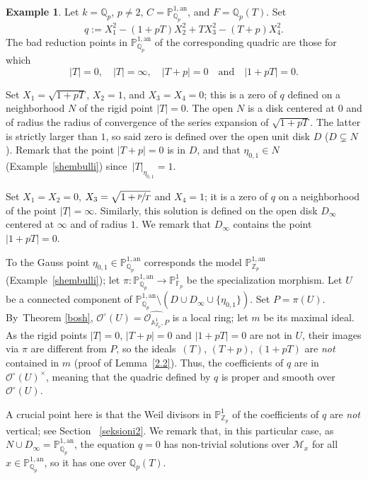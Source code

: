 \documentclass[JEP,XML,SOM,Unicode,NoFloatCountersInSection,published]{cedram}
\newcommand{\quand}{\quad\text{and}\quad}
\let\backslash\setminus
\theoremstyle{definition}
\newtheorem{ex}[thm]{Example}
\begin{document}
\begin{ex}\label{1.8.3}
Let $k=\mathbb{Q}_p$, $p \neq 2$, $C=\mathbb{P}_{\mathbb{Q}_p}^{1, \mathrm{an}}$, and $F=\mathbb{Q}_p(T)$. Set
\[
q:=X_1^2-(1+pT)X_2^2+TX_3^2 - (T+p)X_4^2.
\]
The bad reduction points in $\mathbb{P}_{\mathbb{Q}_p}^{1, \mathrm{an}}$ of the corresponding quadric are those for which
\[
|T|=0,\quad |T|=\infty,\quad |T+p|=0\quand |1+pT|=0.
\]

Set $X_1=\sqrt{1+pT}$, $X_2=1$, and $X_3=X_4=0$; this is a zero of $q$ defined on a neighborhood $N$ of the rigid point $|T|=0$. The open $N$ is a disk centered at $0$ and of radius the radius of convergence of the series expansion of $\sqrt{1+pT}$. The latter is strictly larger than $1$, so said zero is defined over the open unit disk $D$ (\ie $D \subsetneq N$). Remark that the point $|T+p|=0$ is in $D$, and that $\eta_{0,1} \in N$ (\cf Example~\ref{shembulli}) since~$|T|_{\eta_{0,1}}=1$.

Set $X_1=X_2=0$, $X_3=\sqrt{1+\sfrac{p}{T}}$ and $X_4=1$; it is a zero of $q$ on a neighborhood of the point $|T|=\infty$. Similarly, this solution is defined on the open disk $D_{\infty}$ centered at $\infty$ and of radius $1$. We remark that $D_{\infty}$ contains the point $|1+pT|=0$.

To the Gauss point $\eta_{0,1} \in \mathbb{P}_{\mathbb{Q}_p}^{1, \mathrm{an}}$ corresponds the model $\mathbb{P}_{\mathbb{Z}_p}^{1, \mathrm{an}}$ (\cf Example~\ref{shembulli}); let $\pi: \mathbb{P}_{\mathbb{Q}_p}^{1, \mathrm{an}} \to \mathbb{P}_{\mathbb{F}_p}^{1}$ be the specialization morphism.
Let $U$ be a connected component of $\mathbb{P}_{\mathbb{Q}_p}^{1, \mathrm{an}} \backslash (D \cup D_{\infty} \cup \{\eta_{0,1}\})$. Set $P=\pi(U)$. By~Theorem \ref{bosh}, $\mathcal{O}^{\circ}(U)=\widehat{\mathcal{O}_{\mathbb{A}_{\mathbb{Z}_p}^{1},P}}$ is a local ring; let $m$ be its maximal ideal. As the rigid points $|T|=0$, $|T+p|=0$ and $|1+pT|=0$ are not in $U$, their images via $\pi$ are different from $P$, so the ideals~$(T)$, $(T+p)$, $(1+pT)$ are \emph{not} contained in $m$ (\cf proof of Lemma~\ref{2.2}). Thus, the coefficients of $q$ are in~$\mathcal{O}^{\circ}(U)^{\times}$, meaning that the quadric defined by $q$ is proper and smooth over~$\mathcal{O}^{\circ}(U)$.

A crucial point here is that the Weil divisors in $\mathbb{P}_{\mathbb{Z}_p}^{1}$ of the coefficients of $q$ are \emph{not} vertical; see Section ~\ref{seksioni2}.
We remark that, in this particular case, as $N \cup D_{\infty}=\mathbb{P}_{\mathbb{Q}_p}^{1, \mathrm{an}}$, the equation $q=0$ has non-trivial solutions over $\mathscr{M}_x$ for all $x \in \mathbb{P}_{\mathbb{Q}_p}^{1, \mathrm{an}}$, so it has one over $\mathbb{Q}_p(T)$.
\end{ex}
\end{document}

